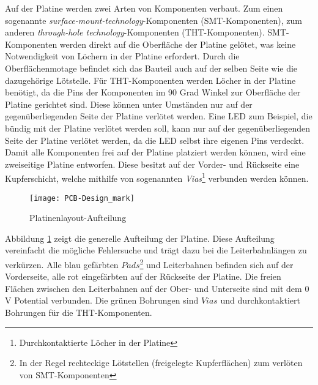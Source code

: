 Auf der Platine werden zwei Arten von Komponenten verbaut. Zum einen sogenannte \textit{surface-mount-technology}-Komponenten (SMT-Komponenten), zum anderen \textit{through-hole technology}-Komponenten (THT-Komponenten). SMT-Komponenten werden direkt auf die Oberfläche der Platine gelötet, was keine Notwendigkeit von Löchern in der Platine erfordert. Durch die Oberflächenmotage befindet sich das Bauteil auch auf der selben Seite wie die dazugehörige Lötstelle. Für THT-Komponenten werden Löcher in der Platine benötigt, da die Pins der Komponenten im 90 Grad Winkel zur Oberfläche der Platine gerichtet sind. Diese können unter Umständen nur auf der gegenüberliegenden Seite der Platine verlötet werden. Eine LED zum Beispiel, die bündig mit der Platine verlötet werden soll, kann nur auf der gegenüberliegenden Seite der Platine verlötet werden, da die LED selbst ihre eigenen Pins verdeckt. Damit alle Komponenten frei auf der Platine platziert werden können, wird eine zweiseitige Platine entworfen. Diese besitzt auf der Vorder- und Rückseite eine Kupferschicht, welche mithilfe von sogenannten \textit{Vias}\footnote{Durchkontaktierte Löcher in der Platine} verbunden werden können.
\begin{figure}[h]
	\begin{center}
		\texttt{[image: PCB-Design\_mark]}
		\caption{Platinenlayout-Aufteilung}
		\label{fig:PCB-Layout}
	\end{center}
\end{figure}
Abbildung \ref{fig:PCB-Layout} zeigt die generelle Aufteilung der Platine. Diese Aufteilung vereinfacht die mögliche Fehlersuche und trägt dazu bei die Leiterbahnlängen zu verkürzen. Alle blau gefärbten $Pads$\footnote{In der Regel rechteckige Lötstellen (freigelegte Kupferflächen) zum verlöten von SMT-Komponenten} und Leiterbahnen befinden sich auf der Vorderseite, alle rot eingefärbten auf der Rückseite der Platine. Die freien Flächen zwischen den Leiterbahnen auf der Ober- und Unterseite sind mit dem 0\,V Potential verbunden. Die grünen Bohrungen sind $Vias$ und durchkontaktiert Bohrungen für die THT-Komponenten.
